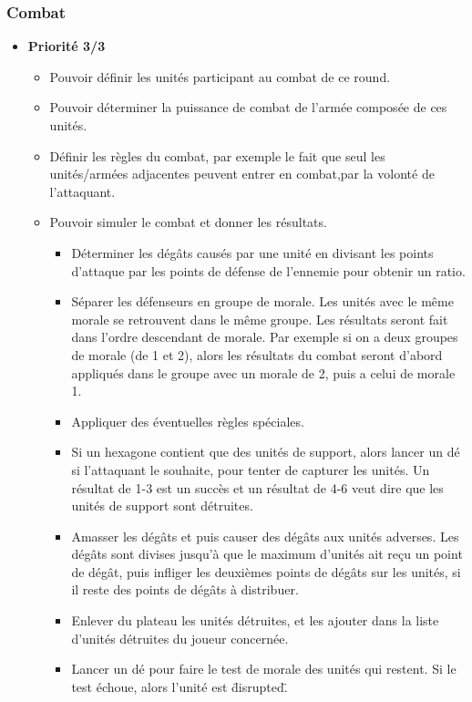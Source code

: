\documentclass{article}[a4paper, 12pt]
\begin{document}
\subsubsection{Combat}
\begin{itemize}
    \item \textbf{Priorité 3/3}
    \begin{itemize}
        \item Pouvoir définir les unités participant au combat de ce round.
        \item Pouvoir déterminer la puissance de combat de l'armée composée de ces unités.
        \item Définir les règles du combat, par exemple le fait que seul les unités/armées adjacentes peuvent entrer en combat,par la volonté de l'attaquant.
        \item Pouvoir simuler le combat et donner les résultats.
        \begin{itemize}
            \item Déterminer les dégâts causés par une unité en divisant les points d'attaque par les points de défense de l'ennemie pour obtenir un ratio.
            \item Séparer les défenseurs en groupe de morale. Les unités avec le même morale se retrouvent dans le même groupe. Les résultats seront fait dans l'ordre descendant de morale. Par exemple si on a deux groupes de morale (de 1 et 2), alors les résultats du combat seront d'abord appliqués dans le groupe avec un morale de 2, puis a celui de morale 1.
            \item Appliquer des éventuelles règles spéciales.
            \item Si un hexagone contient que des unités de support, alors lancer un dé si l'attaquant le souhaite, pour tenter de capturer les unités. Un résultat de 1-3 est un succès et un résultat de 4-6 veut dire que les unités de support sont détruites.
            \item Amasser les dégâts et puis causer des dégâts aux unités adverses. Les dégâts sont divises jusqu'à que le maximum d'unités ait reçu un point de dégât, puis infliger les deuxièmes points de dégâts sur les unités, si il reste des points de dégâts à distribuer.
            \item Enlever du plateau les unités détruites, et les ajouter dans la liste d'unités détruites du joueur concernée.
            \item Lancer un dé pour faire le test de morale des unités qui restent. Si le test échoue, alors l'unité est \"disrupted\".

\end{itemize}
\end{itemize}
\end{itemize}
\end{document}
